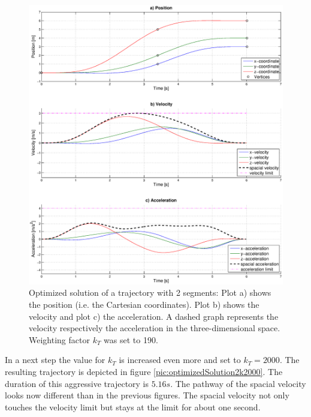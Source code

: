 \begin{figure}[H]
   \centering
   \includegraphics[trim = 33mm 20mm 30mm 15mm,clip,width=1\textwidth]{pics/2SegOpti6s01k190.eps}
   \caption{Optimized solution of a trajectory with 2 segments: Plot a) shows the position (i.e. the Cartesian coordinates). Plot b) shows the velocity and plot c) the acceleration. A dashed graph represents the velocity respectively the acceleration in the three-dimensional space. Weighting factor $k_T$ was set to 190.}
   \label{pic:optimizedSolution2k190}
\end{figure}


In a next step the value for $k_T$ is increased even more and set to $k_T = 2000$. The resulting trajectory is depicted in figure \ref{pic:optimizedSolution2k2000}. The duration of this aggressive trajectory is $5.16s$. The pathway of the spacial velocity looks now different than in the previous figures. The spacial velocity not only touches the velocity limit but stays at the limit for about one second.

